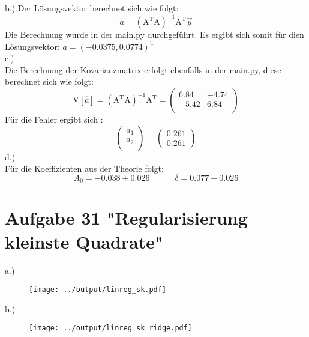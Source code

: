 b.)
Der Lösungsvektor berechnet sich wie folgt:
$$
\hat{a}=(\text{A}^\text{T}\text{A})^{-1}\text{A}^\text{T}\vec{y}
$$
Die Berechnung wurde in der main.py durchgeführt.
Es ergibt sich somit für dien Lösungsvektor: $ a=(-0.0375, 0.0774)^\text{T}$\\
c.)\\
Die Berechnung der Kovarianzmatrix erfolgt ebenfalls in der main.py, diese
berechnet sich wie folgt:
$$
\text{V}[\hat{a}]=(\text{A}^\text{T}\text{A})^{-1}\text{A}^\text{T}=
\begin{pmatrix}
6.84 & -4.74 \\
-5.42 & 6.84 \\
\end{pmatrix}
$$
Für die Fehler ergibt sich :
$$\begin{pmatrix}
a_1 \\
a_2 \\
\end{pmatrix}
=
\begin{pmatrix}
0.261 \\
0.261
\end{pmatrix}
$$
d.)\\
Für die Koeffizienten aus der Theorie folgt:
$$A_0=-0.038 \pm 0.026 \quad \quad \quad \delta= 0.077 \pm 0.026 $$


\section{Aufgabe 31 "Regularisierung kleinste Quadrate"}

a.)
\begin{figure}[ht]
   \centering
 \texttt{[image: ../output/linreg\_sk.pdf]}
   \label{fig1}
\end{figure}
b.)
\begin{figure}[ht]
   \centering
 \texttt{[image: ../output/linreg\_sk\_ridge.pdf]}
   \label{fig1}
\end{figure}
